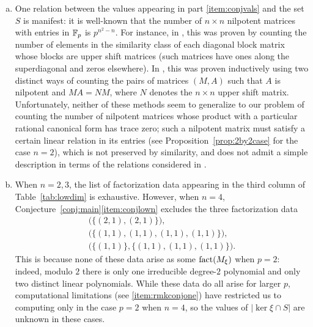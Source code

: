 \begin{rem}
\begin{enumerate}[(a)]
\item One relation between the values appearing in part \eqref{item:conjvals} and the set $S$ is manifest: it is well-known that the number of $n\times n$ nilpotent matrices with entries in $\mathbb{F}_p$ is $p^{n^2-n}$. For instance, in \cite{fine}, this was proven by counting the number of elements in the similarity class of each diagonal block matrix whose blocks are upper shift matrices (such matrices have ones along the superdiagonal and zeros elsewhere). In \cite{gerstenhaber}, this was proven inductively using two distinct ways of counting the pairs of matrices $(M,A)$ such that $A$ is nilpotent and $MA=NM$, where $N$ denotes the $n\times n$ upper shift matrix. Unfortunately, neither of these methods seem to generalize to our problem of counting the number of nilpotent matrices whose product with a particular rational canonical form has trace zero; such a nilpotent matrix must satisfy a certain linear relation in its entries (see Proposition~\ref{prop:2by2case} for the case $n=2$), which is not preserved by similarity, and does not admit a simple description in terms of the relations considered in \cite{gerstenhaber}.\label{item:rmkconjnum}

\item When $n=2,3$, the list of factorization data appearing in the third column of Table~\ref{tab:lowdim} is exhaustive. However, when $n=4$, Conjecture~\ref{conj:main}\eqref{item:conjlown} excludes the three factorization data
\begin{gather*}
\Big(\big\{(2,1),(2,1)\big\}\Big),\\
\Big(\big\{(1,1),(1,1),(1,1),(1,1)\big\}\Big),\\
\Big(\big\{(1,1)\big\},\big\{(1,1),(1,1),(1,1)\big\}\Big).
\end{gather*}
This is because none of these data arise as some $\operatorname{fact}(M_\xi)$ when $p=2$: indeed, modulo $2$ there is only one irreducible degree-$2$ polynomial and only two distinct linear polynomials. While these data do all arise for larger $p$, computational limitations (see \eqref{item:rmkconjone}) have restricted us to computing only in the case $p=2$ when $n=4$, so the values of $|\ker\xi\cap S|$ are unknown in these cases.\label{item:rmkconjtwo}


\end{enumerate}
\end{rem}
